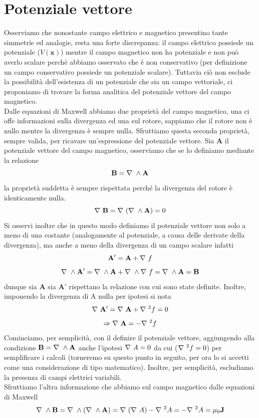 \documentclass[
10pt, %
a4paper, %
oneside, %
headinclude,footinclude, %
BCOR5mm, %
]{scrartcl}
\begin{document}
\section{Potenziale vettore}
Osserviamo che nonostante campo elettrico e magnetico presentino tante simmetrie ed analogie, resta una forte discrepanza: il campo elettrico possiede un potenziale (\(V(\mathbf{x})\)) mentre il campo magnetico non ha potenziale e non può averlo scalare perché abbiamo osservato che è non conservativo (per definizione un campo conservativo possiede un potenziale scalare). Tuttavia ciò non esclude la possibilità dell'esistenza di un potenziale che sia un campo vettoriale, ci proponiamo di trovare la forma analitica del potenziale vettore del campo magnetico.\\
Dalle equazioni di Maxwell abbiamo due proprietà  del campo magnetico, una ci offe informazioni sulla divergenza ed una sul rotore, sappiamo che il rotore non è nullo mentre la divergenza è sempre nulla. Sfruttiamo questa seconda proprietà, sempre valida, per ricavare un'espressione del potenziale vettore. Sia \(\mathbf{A}\) il potenziale vettore del campo magnetico, osserviamo che se lo definiamo mediante la relazione
\[\mathbf{B} = \nabla\  \wedge \mathbf{A}\]
la proprietà suddetta è sempre rispettata perché la divergenza del rotore è identicamente nulla. 
\[\nabla\ \mathbf{B} = \nabla\ (\nabla\  \wedge \mathbf{A})=0\]
Si osservi inoltre che in questo modo definiamo il potenziale vettore non solo a meno di una costante (analogamente al potenziale, a causa delle derivate della divergenza), ma anche a meno della divergenza di un campo scalare infatti
\[\mathbf{A'} = \mathbf{A} + \nabla\  f\]
\[\nabla\ \wedge\mathbf{A'} = \nabla\ \wedge\mathbf{A}+\nabla\ \wedge\nabla\  f = \nabla\ \wedge\mathbf{A} = \mathbf{B}\]
dunque sia \(\mathbf{A}\) sia \(\mathbf{A'}\) rispettano la relazione con cui sono state definite. Inoltre, imponendo la divergenza di A nulla per ipotesi si nota 
\[\nabla\ \mathbf{A'} = \nabla\ \mathbf{A}+\nabla\ ^2 f = 0\]
\[\Rightarrow \nabla\ \mathbf{A} = - \nabla\ ^2f\]
Cominciamo, per semplicità, con il definire il potenziale vettore, aggiungendo alla condizione \(\mathbf{B} = \nabla\  \wedge \mathbf{A}\) anche l'ipotesi \(\nabla\  A = 0\) da cui (\(\nabla\ ^2f = 0\)) per semplificare i calcoli (torneremo su questo punto in seguito, per ora lo si accetti come una considerazione di tipo matematico). Inoltre, per semplicità, escludiamo la presenza di campi elettrici variabili.\\
Sfruttiamo l'altra informazione che abbiamo sul campo magnetico dalle equazioni di Maxwell
\[\nabla\ \wedge\mathbf{B} = \nabla\ \wedge(\nabla\ \wedge\mathbf{A}) = \nabla\ (\nabla\  A)-\nabla\ ^2A = -\nabla\ ^2 A = \mu_0\mathbf{J}\]
\end{document}
